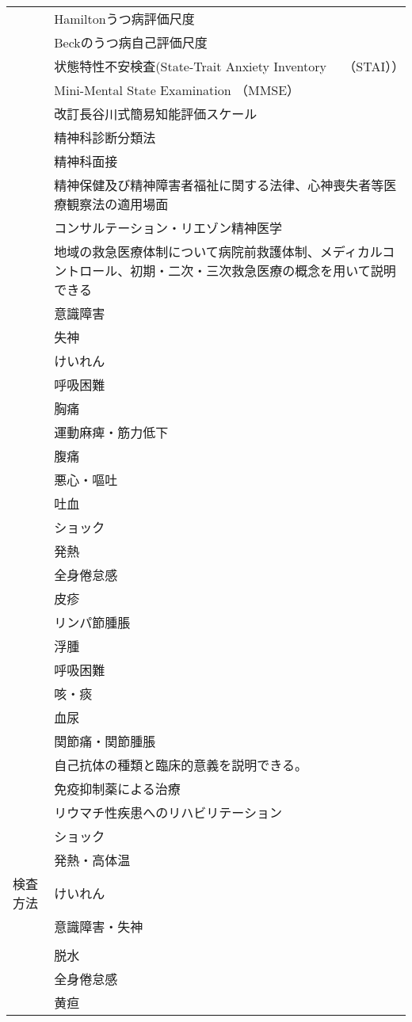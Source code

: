 \begin{xltabular}{\linewidth}{XX}
 & Hamiltonうつ病評価尺度 \\
 & Beckのうつ病自己評価尺度 \\
 & 状態特性不安検査(State-Trait Anxiety Inventory　 （STAI）） \\
 & Mini-Mental State Examination （MMSE） \\
 & 改訂長谷川式簡易知能評価スケール \\
 & 精神科診断分類法 \\
 & 精神科面接 \\
 & 精神保健及び精神障害者福祉に関する法律、心神喪失者等医療観察法の適用場面 \\
 & コンサルテーション・リエゾン精神医学 \\
 & 地域の救急医療体制について病院前救護体制、メディカルコントロール、初期・二次・三次救急医療の概念を用いて説明できる \\
 & 意識障害 \\
 & 失神 \\
 & けいれん \\
 & 呼吸困難 \\
 & 胸痛 \\
 & 運動麻痺・筋力低下 \\
 & 腹痛 \\
 & 悪心・嘔吐 \\
 & 吐血 \\
 & ショック \\
 & 発熱 \\
 & 全身倦怠感 \\
 & 皮疹 \\
 & リンパ節腫脹 \\
 & 浮腫 \\
 & 呼吸困難 \\
 & 咳・痰 \\
 & 血尿 \\
 & 関節痛・関節腫脹 \\
 & 自己抗体の種類と臨床的意義を説明できる。 \\
 & 免疫抑制薬による治療 \\
 & リウマチ性疾患へのリハビリテーション \\
 & ショック \\
 & 発熱・高体温 \\
検査方法 & けいれん \\
 & 意識障害・失神 \\
 &  \\
 & 脱水 \\
 & 全身倦怠感 \\
 & 黄疸 \\

\end{xltabular}
